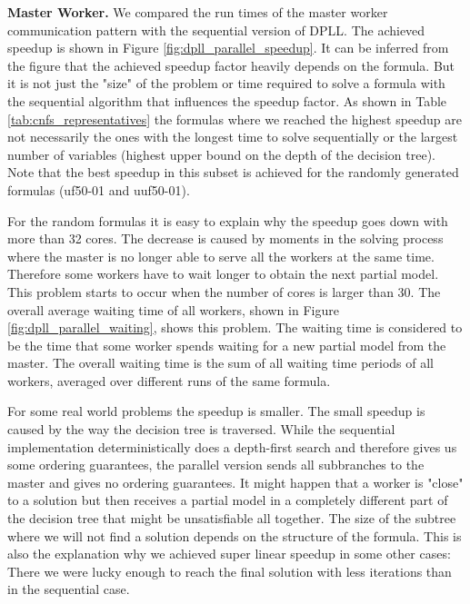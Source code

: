 \documentclass[letterpaper]{article}
\newcommand{\mypar}[1]{{\bf #1.}}
\begin{document}
\mypar{Master Worker}
We compared the run times of the master worker communication pattern with the sequential version of DPLL.
The achieved speedup is shown in Figure \ref{fig:dpll_parallel_speedup}.
It can be inferred from the figure that the achieved speedup factor heavily depends on the formula.
But it is not just the "size" of the problem or time required to solve a formula with the sequential algorithm that influences the speedup factor.
As shown in Table \ref{tab:cnfs_representatives} the formulas where we reached the highest speedup are not necessarily the ones with the longest time to solve sequentially or the largest number of variables (highest upper bound on the depth of the decision tree).
Note that the best speedup in this subset is achieved for the randomly generated formulas (uf50-01 and uuf50-01).

For the random formulas it is easy to explain why the speedup goes down with more than 32 cores.
The decrease is caused by moments in the solving process where the master is no longer able to serve all the workers at the same time.
Therefore some workers have to wait longer to obtain the next partial model.
This problem starts to occur when the number of cores is larger than 30.
The overall average waiting time of all workers, shown in Figure \ref{fig:dpll_parallel_waiting}, shows this problem.
The waiting time is considered to be the time that some worker spends waiting for a new partial model from the master.
The overall waiting time is the sum of all waiting time periods of all workers, averaged over different runs of the same formula.

For some real world problems the speedup is smaller.
The small speedup is caused by the way the decision tree is traversed.
While the sequential implementation deterministically does a depth-first search and therefore gives us some ordering guarantees,
the parallel version sends all subbranches to the master and gives no ordering guarantees.
It might happen that a worker is "close" to a solution but then receives a partial model in a completely different part of the decision tree that might be unsatisfiable all together.
The size of the subtree where we will not find a solution depends on the structure of the formula.
This is also the explanation why we achieved super linear speedup in some other cases:
There we were lucky enough to reach the final solution with less iterations than in the sequential case.
\end{document}

